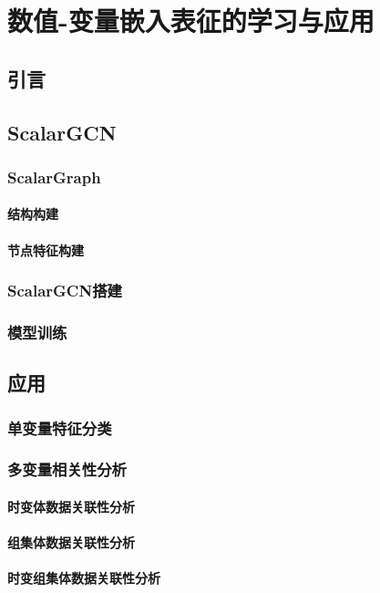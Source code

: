 \chapter{数值-变量嵌入表征的学习与应用}
\section{引言}
\section{ScalarGCN}
\subsection{ScalarGraph}
\subsubsection{结构构建}
\subsubsection{节点特征构建}
\subsection{ScalarGCN搭建}
\subsection{模型训练}
\section{应用}
\subsection{单变量特征分类}
\subsection{多变量相关性分析}
\subsubsection{时变体数据关联性分析}
\subsubsection{组集体数据关联性分析}
\subsubsection{时变组集体数据关联性分析}
